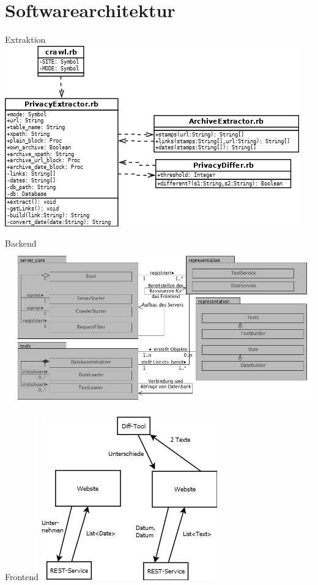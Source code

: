 \documentclass[halfparskip]{beamer}
\begin{document}
\section{Softwarearchitektur}
\begin{frame}{Extraktion}
	\centering
	\includegraphics[scale=0.5]{extraction.png}
\end{frame}
\begin{frame}{Backend}
	\centering
	\includegraphics[scale=0.3]{backend.png}
\end{frame}
\begin{frame}{Frontend}
	\centering
	\includegraphics[scale=0.75]{frontend.png}
\end{frame}
\end{document}
